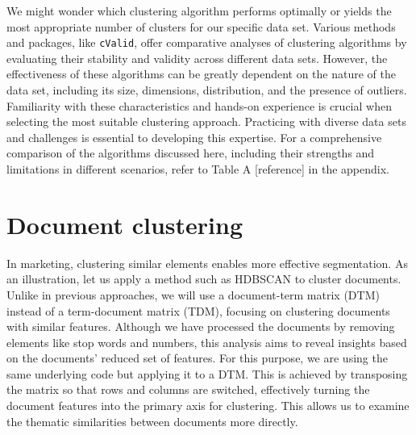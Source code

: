 We might wonder which clustering algorithm performs optimally or yields
the most appropriate number of clusters for our specific data set.
Various methods and packages, like \texttt{cValid}, offer comparative
analyses of clustering algorithms by evaluating their stability and
validity across different data sets. However, the effectiveness of these
algorithms can be greatly dependent on the nature of the data set,
including its size, dimensions, distribution, and the presence of
outliers. Familiarity with these characteristics and hands-on experience
is crucial when selecting the most suitable clustering approach.
Practicing with diverse data sets and challenges is essential to
developing this expertise. For a comprehensive comparison of the
algorithms discussed here, including their strengths and limitations in
different scenarios, refer to Table A {[}reference{]} in the appendix.

\section{Document clustering}\label{documents-clustering}

In marketing, clustering similar elements enables more effective
segmentation. As an illustration, let us apply a method such
as HDBSCAN to cluster documents. Unlike in previous approaches, we will
use a document-term matrix (DTM) instead of a term-document matrix
(TDM), focusing on clustering documents with similar features. Although
we have processed the documents by removing elements like stop words and
numbers, this analysis aims to reveal insights based on the documents'
reduced set of features. For this purpose, we are using the same underlying
code but applying it to a DTM. This is achieved by transposing the matrix
so that rows and columns are switched, effectively turning the document
features into the primary axis for clustering. This allows us to examine
the thematic similarities between documents more directly.

\begin{Shaded}
\begin{Highlighting}[]

\OtherTok{\textless{}{-}} 

\OtherTok{\textless{}{-}}  \NormalTok{)}

\NormalTok{(}\NormalTok{(} \SpecialCharTok{$}
              \NormalTok{,}
              \NormalTok{)}
\end{Highlighting}
\end{Shaded}

